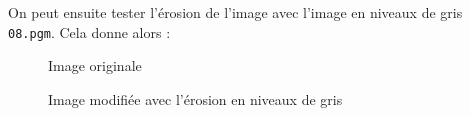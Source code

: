 \documentclass[french,a4paper,10pt]{article}
\begin{document}
	On peut ensuite tester l'érosion de l'image avec l'image en niveaux de gris \texttt{08.pgm}.
	Cela donne alors :
	\begin{figure}[!htb]
		\begin{minipage}{0.48\textwidth}
			\centering
			\caption{Image originale}\label{Fig:orig-08-2}
		\end{minipage}\hfill
		\begin{minipage}{0.48\textwidth}
			\centering
			\caption{Image modifiée avec l'érosion en niveaux de gris}\label{Fig:erosion-grey-08}
		\end{minipage}
	\end{figure}
\end{document}
